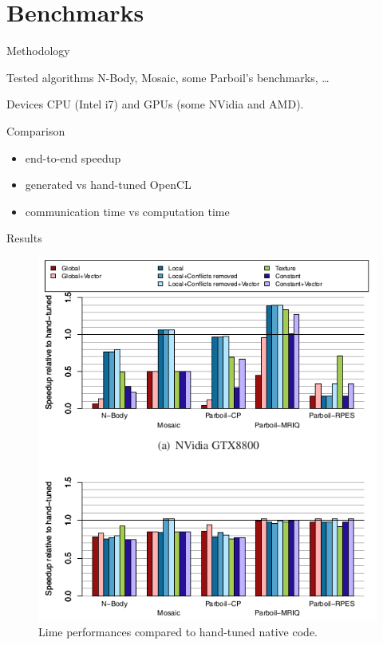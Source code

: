 \documentclass[10pt, compress]{beamer}
\begin{document}
\section{Benchmarks}

\begin{frame}{Methodology}
    \begin{block}{Tested algorithms}
    N-Body, Mosaic, some Parboil's benchmarks, \ldots
    \end{block}
    \begin{block}{Devices}
    CPU (Intel i7) and GPUs (some NVidia and AMD).
    \end{block}
    \begin{block}{Comparison}
        \begin{itemize}
        \item end-to-end speedup
        \item generated vs hand-tuned OpenCL
        \item communication time vs computation time
        \end{itemize}
    \end{block}
\end{frame}

\begin{frame}{Results}
    \begin{figure}
    \centering
    \includegraphics[scale=0.35]{images/lime_perf_hand.png}
    \caption{Lime performances compared to hand-tuned native code.}
    \label{img:lime_perf_hand}
    \end{figure}
\end{frame}
\end{document}
